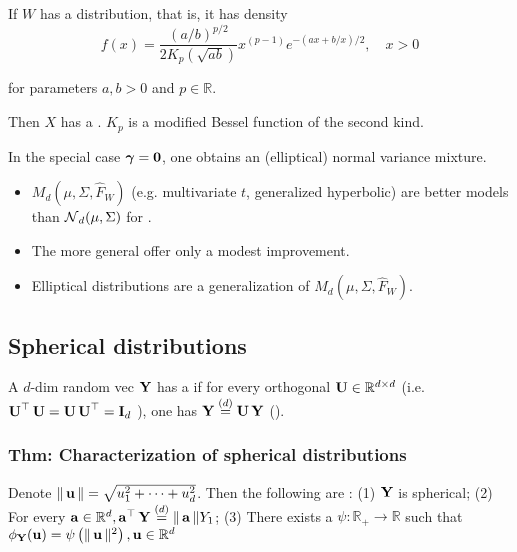 If $W$ has a  distribution, that is, it has density
$$
f(x)=\frac{(a / b)^{p / 2}}{2 K_{p}(\sqrt{a b})} x^{(p-1)} e^{-(a x+b / x) / 2}, \quad x>0 
$$

for parameters $a, b>0$ and $p \in \mathbb{R}$.

Then $X$ has a . $K_{p}$ is a modified Bessel function of the second kind.

In the special case $\vect{\gamma}=\vect{0}$, one obtains an (elliptical) normal variance mixture.






\begin{itemize}[leftmargin=*]
    \item $M_{d}\left(\mu, \Sigma, \hat{F}_{W}\right)$ (e.g. multivariate $t$, generalized hyperbolic) are better models than $\N_{d}(\mu, \Sigma)$ for .
    \item The more general  offer only a modest improvement.
    \item Elliptical distributions are a generalization of $M_{d}\left(\mu, \Sigma, \hat{F}_{W}\right)$.
\end{itemize}



\subsection*{Spherical distributions}
A $d$-dim random vec $\Y$ has a  if for every orthogonal $\U \in \mathbb{R}^{d \times d}$ (i.e. $\U^{\T} \U=\U \U^{\T}=\I_{d}$ ), one has $\Y \stackrel{(d)}{=}\U \Y$ ().



\subsubsection*{Thm: Characterization of spherical distributions}
Denote $\|\u\|=\sqrt{u_{1}^{2}+\cdots+u_{d}^{2}}$. Then the following are :
(1) $\Y$ is spherical; 
(2) For every $\a \in \mathbb{R}^{d}, \a^{\T} \Y \stackrel{(d)}{=}\|\a\| Y_{1}$;
(3) There exists a  $\psi: \mathbb{R}_{+} \rightarrow \mathbb{R}$ such that $\phi_{\Y}(\u)=\psi\left(\|\u\|^{2}\right), \u \in \mathbb{R}^{d}$

